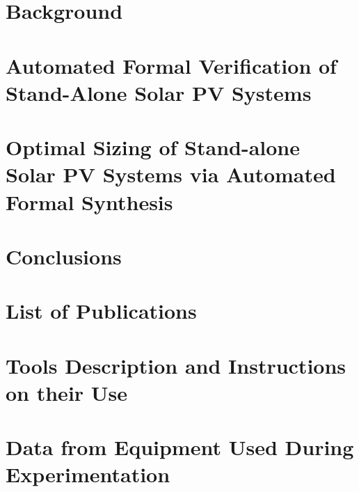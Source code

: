\documentclass[12pt,twoside]{report}
\begin{document}
\chapter{Background}
\label{chap:background}


%
%
%

\chapter{Automated Formal Verification of Stand-Alone Solar PV Systems}
\label{chap:automatedverification}


\chapter{Optimal Sizing of Stand-alone Solar PV Systems via Automated Formal Synthesis}
\label{chap:automatedsynthesis}


\chapter{Conclusions}
\label{chap:conclusions}


\appendix
\chapter{List of Publications}
\label{chap:publications}


\chapter{Tools Description and Instructions on their Use}
\label{chap:tools}


\chapter{Data from Equipment Used During Experimentation}
\label{chap:data}


\renewcommand\bibname{References}
%
{}
\end{document}
